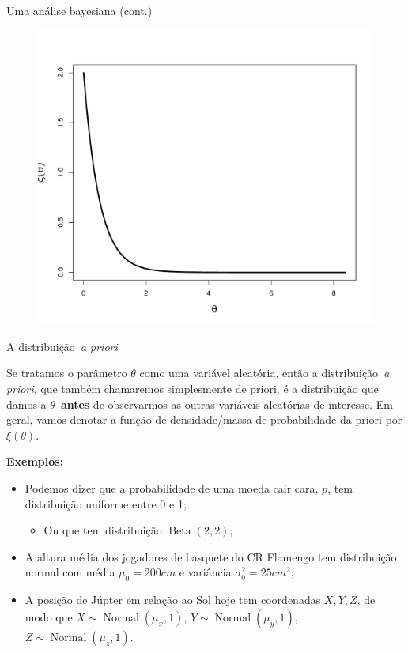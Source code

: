 \begin{frame}{Uma análise bayesiana (cont.)}
 \begin{figure}[!ht]
\label{fig:gamma_1_2}
\begin{center}
\includegraphics[scale=0.4]{figures/gamma_1_2.pdf} 
\end{center} 
\end{figure} 
\end{frame}
\begin{frame}{A distribuição~\textit{a priori}}
\begin{defn}
\label{def:prior}
 Se tratamos o parâmetro $\theta$ como uma variável aleatória, então a distribuição~\textit{a priori}, que também chamaremos simplesmente de priori, é a distribuição que damos a $\theta$~\textbf{antes} de observarmos as outras variáveis aleatórias de interesse.
 Em geral, vamos denotar a função de densidade/massa de probabilidade da priori por $\xi(\theta)$.
\end{defn}
\textbf{Exemplos:}
\begin{itemize}
 \item Podemos dizer que a probabilidade de uma moeda cair cara, $p$, tem distribuição uniforme entre 0 e 1;
 \begin{itemize}
  \item Ou que tem distribuição $\operatorname{Beta}(2, 2)$;
 \end{itemize}
 \item A altura média dos jogadores de basquete do CR Flamengo tem distribuição normal com média $\mu_0 = 200 cm$ e variância $\sigma_0^2 = 25 cm^2$;
 \item A posição de Júpter em relação ao Sol hoje tem coordenadas $X,Y, Z$, de modo que $X \sim \operatorname{Normal}(\mu_x, 1)$, $Y \sim \operatorname{Normal}(\mu_y, 1)$, $Z \sim \operatorname{Normal}(\mu_z, 1)$.
\end{itemize}
\end{frame}
